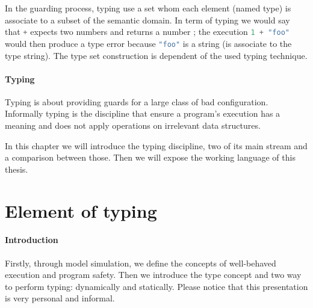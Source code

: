 \documentclass[a4paper]{report}
\newcommand{\icode}[1]{\colorbox{white}{\lstinline[language=scheme]&#1&}} %
\begin{document}

In the guarding process, typing use a set whom each element (named type) is associate to a subset of the semantic domain. In term of typing we would say that \icode{+} expects two numbers and returns a number ; the execution \icode{1 + "foo"} would then produce a type error because \icode{"foo"} is a string (is associate to the type string). The type set construction is dependent of the used typing technique.

\paragraph{Typing} Typing is about providing guards for a large class of bad configuration. Informally typing is the discipline that ensure a program's execution has a meaning and does not apply operations on irrelevant data structures. 

In this chapter we will introduce the typing discipline, two of its main stream and a comparison between those. Then we will expose the working language of this thesis.

\section{Element of typing}

\paragraph{Introduction}  Firstly, through model simulation, we define the concepts of well-behaved execution and program safety. Then we introduce the type concept and two way to perform typing: dynamically and statically. Please notice that this presentation is very personal and informal.
\end{document}
